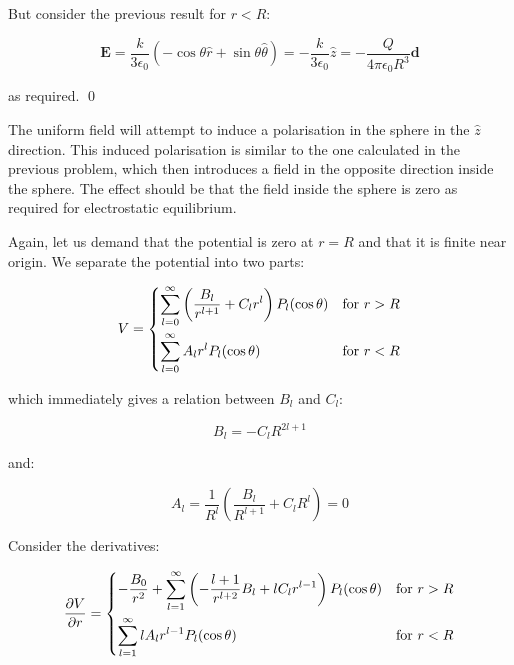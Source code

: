\documentclass[12pt]{article}
\begin{document}
But consider the previous result for $r < R$:

\begin{equation}
    \mathbf{E} = \frac{k}{3\epsilon_{0}} \left( -\cos{\theta} \hat{r} + \sin{\theta} \hat{\theta} \right) = -\frac{k}{3\epsilon_{0}} \hat{z} = -\frac{Q}{4\pi\epsilon_{0}R^{3}} \mathbf{d}
\end{equation}

as required.
\qed



The uniform field will attempt to induce a polarisation in the sphere in the $\hat{z}$ direction. This induced polarisation is similar to the one calculated in the previous problem, which then introduces a field in the opposite direction inside the sphere. The effect should be that the field inside the sphere is zero as required for electrostatic equilibrium.

Again, let us demand that the potential is zero at $r = R$ and that it is finite near origin. We separate the potential into two parts:

\begin{equation}
V =
\begin{dcases}
    \sum_{l=0}^{\infty} \left( \frac{B_{l}}{r^{l+1}} + C_{l} r^{l} \right) P_{l}(\cos{\theta}) & \text{for } r > R \\
    \sum_{l=0}^{\infty} A_{l} r^{l} P_{l}(\cos{\theta}) & \text{for } r < R
\end{dcases}
\end{equation}

which immediately gives a relation between $B_{l}$ and $C_{l}$:

\begin{equation}
    B_{l} = -C_{l} R^{2l+1}
\end{equation}

and:

\begin{equation}
    A_{l} = \frac{1}{R^{l}} \left( \frac{B_{l}}{R^{l+1}} + C_{l} R^{l} \right) = 0
\end{equation}

Consider the derivatives:

\begin{equation}
\frac{\partial V}{\partial r} =
\begin{dcases}
    -\frac{B_{0}}{r^2} + \sum_{l=1}^{\infty} \left( -\frac{l+1}{r^{l+2}} B_{l} + l C_{l} r^{l-1} \right) P_{l}(\cos{\theta}) & \text{for } r > R \\
    \sum_{l=1}^{\infty} l A_{l} r^{l-1} P_{l}(\cos{\theta}) & \text{for } r < R
\end{dcases}
\end{equation}
\end{document}
